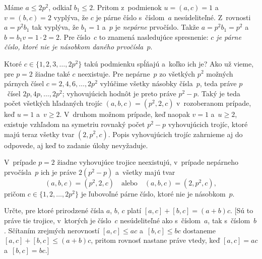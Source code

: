 {%

Máme $a\le 2p^2$, odkiaľ $b_1\le 2$. Pritom z~podmienok
$u=(a,c)=1$ a~$v=(b,c)=2$ vyplýva, že $c$ je párne číslo s~číslom~$a$
nesúdeliteľné. Z~rovnosti $a=p^2b_1$ tak vyplýva, že $b_1=1$ a~$p$ je {\it nepárne\/}
prvočíslo. Takže $a=p^2b_1=p^2$ a~$b=b_1v=1\cdot2=2$.
Pre číslo~$c$ to znamená nasledujúce spresnenie:
{\it $c$ je párne číslo, ktoré nie je násobkom daného prvočísla~$p$}.

Ktoré $c\in\{1,2,3,\dots,2p^2\}$ takú podmienku spĺňajú a~koľko ich je?
Ako už vieme, pre $p=2$ žiadne také $c$ neexistuje.
Pre nepárne~$p$ zo všetkých $p^2$ možných
párnych čísel $c=2,4,6,\dots,2p^2$ vylúčime všetky
násobky čísla~$p$, teda práve $p$~čísel $2p,4p,\dots,2p^2$;
vyhovujúcich hodnôt je preto práve $p^2-p$. Taký je teda počet
všetkých hľadaných trojíc $(a,b,c)=(p^2,2,c)$ v~rozoberanom prípade,
keď $u=1$ a~$v\ge2$. V~druhom možnom prípade, keď naopak $v=1$
a~$u\ge2$, existuje vzhľadom na symetriu rovnaký počet $p^2-p$
vyhovujúcich trojíc, ktoré majú teraz všetky tvar
$(2,p^2,c)$. Popis vyhovujúcich trojíc zahrnieme aj do odpovede,
aj keď to zadanie úlohy nevyžaduje.

\odpoved
V~prípade $p=2$ žiadne vyhovujúce trojice neexistujú,
v~prípade nepárneho prvočísla~$p$ ich je práve $2(p^2-p)$
a~všetky majú tvar
$$
(a,b,c)=(p^2,2,c)\quad\text{alebo}\quad(a,b,c)=(2,p^2,c),
$$
pričom $c\in\{1,2,\dots,2p^2\}$ je ľubovoľné párne číslo, ktoré nie je
násobkom~$p$.


Určte, pre ktoré prirodzené čísla $a$, $b$, $c$ platí
$[a,c]+[b,c]=(a+b)c$. [Sú to práve tie trojice,
v~ktorých je číslo~$c$ nesúdeliteľné ako s~číslom~$a$,
tak s~číslom~$b$. Sčítaním zrejmých nerovností $[a,c]\le ac$
a~$[b,c]\le bc$ dostaneme $[a,c]+[b,c]\le(a+b)c$, pritom
rovnosť nastane práve vtedy, keď $[a,c]=ac$ a~$[b,c]=bc$.]

}
